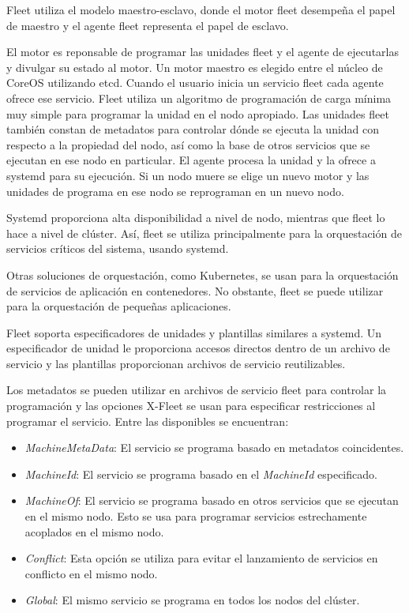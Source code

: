 Fleet utiliza el modelo maestro-esclavo, donde el motor fleet desempeña el papel de maestro y el agente fleet representa el papel de esclavo.

El motor es reponsable de programar las unidades fleet y el agente de ejecutarlas y divulgar su estado al motor. Un motor maestro es elegido entre el núcleo de CoreOS utilizando etcd. Cuando el usuario inicia un servicio fleet cada agente ofrece ese servicio. Fleet utiliza un algoritmo de programación de carga mínima muy simple para programar la unidad en el nodo apropiado. Las unidades fleet también constan de metadatos para controlar dónde se ejecuta la unidad con respecto a la propiedad del nodo, así como la base de otros servicios que se ejecutan en ese nodo en particular. El agente procesa la unidad y la ofrece a systemd para su ejecución. Si un nodo muere se elige un nuevo motor y las unidades de programa en ese nodo se reprograman en un nuevo nodo. 

Systemd proporciona alta disponibilidad a nivel de nodo, mientras que fleet lo hace a nivel de clúster. Así, fleet se utiliza principalmente para la orquestación de servicios críticos del sistema, usando systemd. 

Otras soluciones de orquestación, como Kubernetes, se usan para la orquestación de servicios de aplicación en contenedores. No obstante, fleet se puede utilizar para la orquestación de pequeñas aplicaciones.

Fleet soporta especificadores de unidades y plantillas similares a systemd. Un especificador de unidad le proporciona accesos directos dentro de un archivo de servicio y las plantillas proporcionan archivos de servicio reutilizables.

Los metadatos se pueden utilizar en archivos de servicio fleet para controlar la programación y las opciones X-Fleet se usan para especificar restricciones al programar el servicio. Entre las disponibles se encuentran:
\begin{itemize}
\item \textit{MachineMetaData}: El servicio se programa basado en metadatos coincidentes.
\item \textit{MachineId}: El servicio se programa basado en el \textit{MachineId} especificado.
\item \textit{MachineOf}: El servicio se programa basado en otros servicios que se ejecutan en el mismo nodo. Esto se usa para programar servicios estrechamente acoplados en el mismo nodo.
\item \textit{Conflict}: Esta opción se utiliza para evitar el lanzamiento de servicios en conflicto en el mismo nodo.
\item \textit{Global}: El mismo servicio se programa en todos los nodos del clúster.
\end{itemize}

